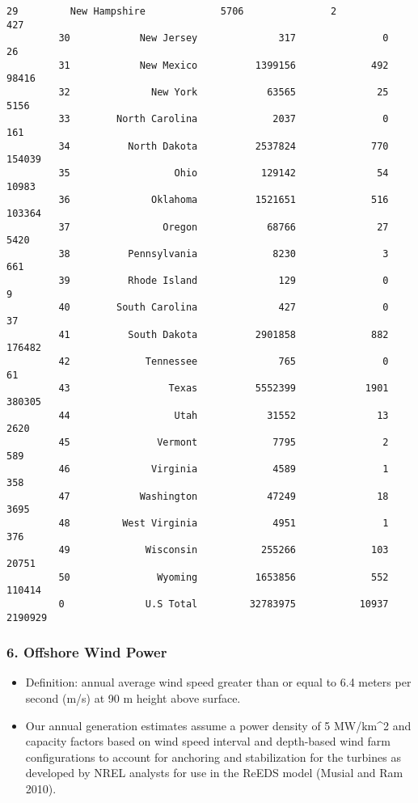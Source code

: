 \documentclass[11pt]{article}
\providecommand{\tightlist}{%
      \setlength{\itemsep}{0pt}\setlength{\parskip}{0pt}}
\begin{document}
\begin{Verbatim}[commandchars=\\\{\}]
         29         New Hampshire             5706               2              427
         30            New Jersey              317               0               26
         31            New Mexico          1399156             492            98416
         32              New York            63565              25             5156
         33        North Carolina             2037               0              161
         34          North Dakota          2537824             770           154039
         35                  Ohio           129142              54            10983
         36              Oklahoma          1521651             516           103364
         37                Oregon            68766              27             5420
         38          Pennsylvania             8230               3              661
         39          Rhode Island              129               0                9
         40        South Carolina              427               0               37
         41          South Dakota          2901858             882           176482
         42             Tennessee              765               0               61
         43                 Texas          5552399            1901           380305
         44                  Utah            31552              13             2620
         45               Vermont             7795               2              589
         46              Virginia             4589               1              358
         47            Washington            47249              18             3695
         48         West Virginia             4951               1              376
         49             Wisconsin           255266             103            20751
         50               Wyoming          1653856             552           110414
         0              U.S Total         32783975           10937          2190929
\end{Verbatim}
            
    \subsubsection{6. Offshore Wind Power}\label{offshore-wind-power}

\begin{itemize}
\tightlist
\item
  Definition: annual average wind speed greater than or equal to 6.4
  meters per second (m/s) at 90 m height above surface.
\item
  Our annual generation estimates assume a power density of 5 MW/km\^{}2
  and capacity factors based on wind speed interval and depth-based wind
  farm configurations to account for anchoring and stabilization for the
  turbines as developed by NREL analysts for use in the ReEDS model
  (Musial and Ram 2010).
\end{itemize}
\end{document}
